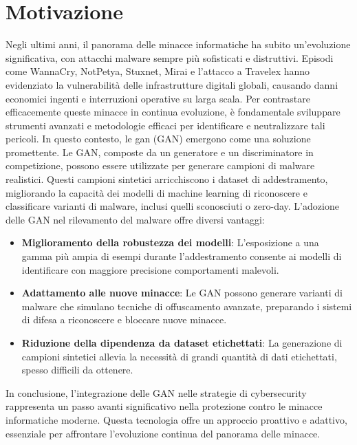 \section{Motivazione}
Negli ultimi anni, il panorama delle minacce informatiche ha subito un'evoluzione significativa, con attacchi malware sempre più sofisticati e distruttivi. Episodi come WannaCry, NotPetya, Stuxnet, Mirai e l'attacco a Travelex hanno evidenziato la vulnerabilità delle infrastrutture digitali globali, causando danni economici ingenti e interruzioni operative su larga scala.
Per contrastare efficacemente queste minacce in continua evoluzione, è fondamentale sviluppare strumenti avanzati e metodologie efficaci per identificare e neutralizzare tali pericoli. In questo contesto, le \gls{gan} (GAN) emergono come una soluzione promettente. Le GAN, composte da un generatore e un discriminatore in competizione, possono essere utilizzate per generare campioni di malware realistici. Questi campioni sintetici arricchiscono i dataset di addestramento, migliorando la capacità dei modelli di machine learning di riconoscere e classificare varianti di malware, inclusi quelli sconosciuti o zero-day.
L'adozione delle GAN nel rilevamento del malware offre diversi vantaggi:
\begin{itemize} 
    \item \textbf{Miglioramento della robustezza dei modelli}: L'esposizione a una gamma più ampia di esempi durante l'addestramento consente ai modelli di identificare con maggiore precisione comportamenti malevoli. 
    \item \textbf{Adattamento alle nuove minacce}: Le GAN possono generare varianti di malware che simulano tecniche di offuscamento avanzate, preparando i sistemi di difesa a riconoscere e bloccare nuove minacce. 
    \item \textbf{Riduzione della dipendenza da dataset etichettati}: La generazione di campioni sintetici allevia la necessità di grandi quantità di dati etichettati, spesso difficili da ottenere. 
\end{itemize}
In conclusione, l'integrazione delle GAN nelle strategie di \gls{cybersecurity} rappresenta un passo avanti significativo nella protezione contro le minacce informatiche moderne. Questa tecnologia offre un approccio proattivo e adattivo, essenziale per affrontare l'evoluzione continua del panorama delle minacce.


